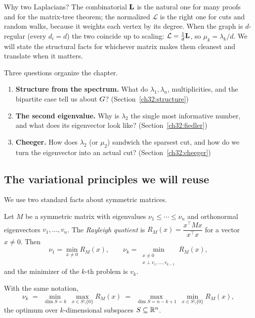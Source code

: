 Why two Laplacians? The combinatorial $\mathbf{L}$ is the natural one for many proofs and for the matrix-tree theorem; the normalized $\mathcal{L}$ is the right one for cuts and random walks, because it weights each vertex by its degree. When the graph is $d$-regular (every $d_i=d$) the two coincide up to scaling: $\mathcal{L}=\frac1d\mathbf{L}$, so $\mu_k=\lambda_k/d$. We will state the structural facts for whichever matrix makes them cleanest and translate when it matters.

\begin{focusbox}
Three questions organize the chapter.
\begin{enumerate}
  \item \textbf{Structure from the spectrum.} What do $\lambda_1,\lambda_n$, multiplicities, and the bipartite case tell us about $G$? (Section~\ref{ch32:structure})
  \item \textbf{The second eigenvalue.} Why is $\lambda_2$ the single most informative number, and what does its eigenvector look like? (Section~\ref{ch32:fiedler})
  \item \textbf{Cheeger.} How does $\lambda_2$ (or $\mu_2$) sandwich the sparsest cut, and how do we turn the eigenvector into an actual cut? (Section~\ref{ch32:cheeger})
\end{enumerate}
\end{focusbox}

\subsection{The variational principles we will reuse}

We use two standard facts about symmetric matrices.

\begin{lemma}
\label{ch32:rayleigh}
Let $M$ be a symmetric matrix with eigenvalues $\nu_1\le\cdots\le\nu_n$ and orthonormal eigenvectors $v_1,\dots,v_n$. The \emph{Rayleigh quotient} is $R_M(x)=\dfrac{x^\top M x}{x^\top x}$ for a vector $x\ne 0$. Then
\[
  \nu_1=\min_{x\ne 0} R_M(x),\qquad
  \nu_k=\min_{\substack{x\ne 0\\ x\perp v_1,\dots,v_{k-1}}} R_M(x),
\]
and the minimizer of the $k$-th problem is $v_k$.
\end{lemma}

\begin{lemma}
\label{ch32:courant-fischer}
With the same notation,
\[
  \nu_k \;=\; \min_{\dim S = k}\ \max_{x\in S\setminus\{0\}} R_M(x)
        \;=\; \max_{\dim S = n-k+1}\ \min_{x\in S\setminus\{0\}} R_M(x),
\]
the optimum over $k$-dimensional subspaces $S\subseteq\mathbb{R}^n$.
\end{lemma}

